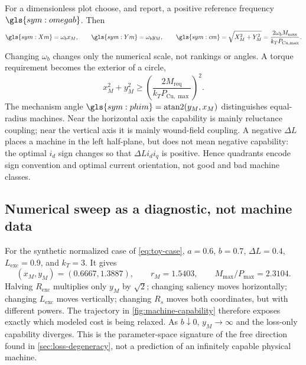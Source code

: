 For a dimensionless plot choose, and report, a positive reference frequency
\(\gls{sym:omegab}\).  Then
\begin{equation}
 \gls{sym:Xm}=\omega_bx_M,\qquad
 \gls{sym:Ym}=\omega_by_M,\qquad
 \gls{sym:cm}=\sqrt{X_M^2+Y_M^2}
 =\frac{2\omega_bM_{\max}}{k_TP_{\mathrm{Cu},\max}}.
 \label{eq:dimensionless-capability}
\end{equation}
Changing \(\omega_b\) changes only the numerical scale, not rankings or
angles.  A torque requirement becomes the exterior of a circle,
\begin{equation}
 \boxed{x_M^2+y_M^2\geq
 \left(\frac{2M_{\mathrm{req}}}{k_TP_{\mathrm{Cu},\max}}\right)^2.}
 \label{eq:machine-capability-circle}
\end{equation}
The mechanism angle
\(\gls{sym:phim}=\operatorname{atan2}(y_M,x_M)\) distinguishes equal-radius
machines.  Near the horizontal axis the capability is mainly reluctance
coupling; near the vertical axis it is mainly wound-field coupling.  A
negative \(\Delta L\) places a machine in the left half-plane, but does not
mean negative capability: the optimal \(i_d\) sign changes so that
\(\Delta L i_di_q\) is positive.  Hence quadrants encode sign convention and
optimal current orientation, not good and bad machine classes.



\subsection{Numerical sweep as a diagnostic, not machine data}

For the synthetic normalized case of \cref{eq:toy-case},
\(a=0.6\), \(b=0.7\), \(\Delta L=0.4\), \(L_{\mathrm{exc}}=0.9\),
and \(k_T=3\).  It gives
\begin{equation}
 (x_M,y_M)=(0.6667,1.3887),\qquad
 r_M=1.5403,\qquad M_{\max}/P_{\max}=2.3104.
\end{equation}
Halving \(R_{\mathrm{exc}}\) multiplies only \(y_M\) by \(\sqrt2\); changing
saliency moves horizontally; changing \(L_{\mathrm{exc}}\) moves vertically;
changing \(R_s\) moves both coordinates, but with different powers.  The
trajectory in \cref{fig:machine-capability} therefore exposes exactly which
modeled cost is being relaxed.  As \(b\downarrow0\), \(y_M\to\infty\) and the
loss-only capability diverges.  This is the parameter-space signature of the
free direction found in \cref{sec:loss-degeneracy}, not a prediction of an
infinitely capable physical machine.
